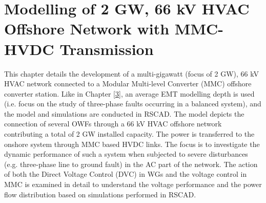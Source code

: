 \chapter{Modelling of 2 GW, 66 kV HVAC Offshore Network with MMC-HVDC Transmission}\label{4}
This chapter details the development of a multi-gigawatt (focus of 2 GW), 66 kV \gls{HVAC} network connected to a Modular Multi-level Converter (\gls{MMC}) offshore converter station. Like in Chapter \ref{3}, an average \gls{EMT} modelling depth is used (i.e. focus on the study of three-phase faults occurring in a balanced system), and the model and simulations are conducted in RSCAD. The model depicts the connection of several \gls{OWF}s through a 66 kV \gls{HVAC} offshore network contributing a total of 2 GW installed capacity. The power is transferred to the onshore system through \gls{MMC} based \gls{HVDC} links. The focus is to investigate the dynamic performance of such a system when subjected to severe disturbances (e.g. three-phase line to ground fault) in the \gls{AC} part of the network. The action of both the Direct Voltage Control (\gls{DVC}) in \gls{WG}s and the voltage control in \gls{MMC} is examined in detail to understand the voltage performance and the power flow distribution based on simulations performed in RSCAD. %

